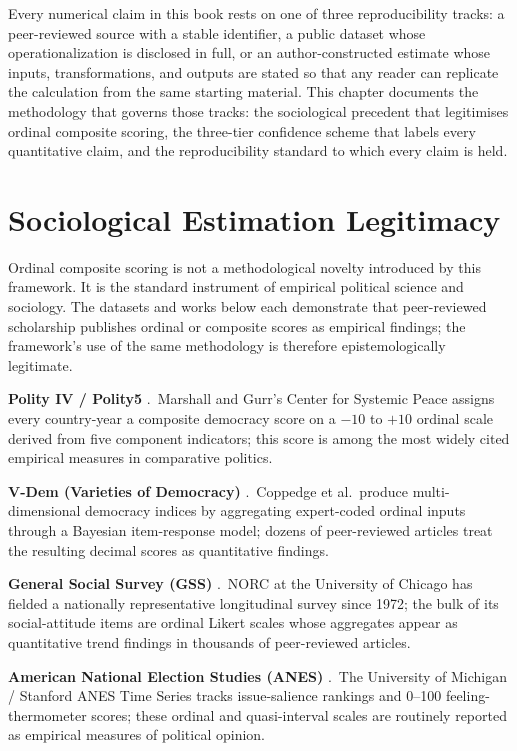 \documentclass[12pt,openany]{book}
\numberwithin{equation}{chapter}
\begin{document}
Every numerical claim in this book rests on one of three reproducibility tracks: a peer-reviewed source with a stable identifier, a public dataset whose operationalization is disclosed in full, or an author-constructed estimate whose inputs, transformations, and outputs are stated so that any reader can replicate the calculation from the same starting material. This chapter documents the methodology that governs those tracks: the sociological precedent that legitimises ordinal composite scoring, the three-tier confidence scheme that labels every quantitative claim, and the reproducibility standard to which every claim is held.

\section*{Sociological Estimation Legitimacy}

Ordinal composite scoring is not a methodological novelty introduced by this framework. It is the standard instrument of empirical political science and sociology. The datasets and works below each demonstrate that peer-reviewed scholarship publishes ordinal or composite scores as empirical findings; the framework's use of the same methodology is therefore epistemologically legitimate.

\textbf{Polity IV / Polity5} \cite{polityiv}.\ Marshall and Gurr's Center for Systemic Peace assigns every country-year a composite democracy score on a $-10$ to $+10$ ordinal scale derived from five component indicators; this score is among the most widely cited empirical measures in comparative politics.

\textbf{V-Dem (Varieties of Democracy)} \cite{vdem}.\ Coppedge et al.\ produce multi-dimensional democracy indices by aggregating expert-coded ordinal inputs through a Bayesian item-response model; dozens of peer-reviewed articles treat the resulting decimal scores as quantitative findings.

\textbf{General Social Survey (GSS)} \cite{gss_norc}.\ NORC at the University of Chicago has fielded a nationally representative longitudinal survey since 1972; the bulk of its social-attitude items are ordinal Likert scales whose aggregates appear as quantitative trend findings in thousands of peer-reviewed articles.

\textbf{American National Election Studies (ANES)} \cite{anes_cumulative}.\ The University of Michigan / Stanford ANES Time Series tracks issue-salience rankings and 0--100 feeling-thermometer scores; these ordinal and quasi-interval scales are routinely reported as empirical measures of political opinion.
\end{document}

